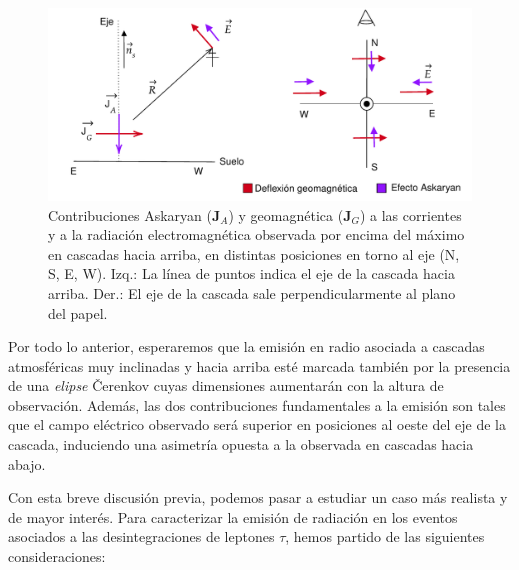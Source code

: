 \documentclass[11 pt, a4paper]{article} %
\numberwithin{equation}{section}
\numberwithin{figure}{section}
\numberwithin{table}{section}
\newcommand{\vect}[1]{\boldsymbol{\mathbf{#1}}}
\begin{document}
\begin{figure}[H]
	\centering
	\includegraphics[width=.8\linewidth]{figures/Radio_UG/Polarizacion_UG}
	\caption{Contribuciones Askaryan ($\vect{J}_A$) y geomagnética ($\vect{J}_G$) a las corrientes y a la radiación electromagnética observada por encima del máximo en cascadas hacia arriba, en distintas posiciones en torno al eje (N, S, E, W). Izq.: La línea de puntos indica el eje de la cascada hacia arriba. Der.: El eje de la cascada sale perpendicularmente al plano del papel.}
	\label{Polarizacion_UG}
\end{figure}
Por todo lo anterior, esperaremos que la emisión en radio asociada a cascadas atmosféricas muy inclinadas y hacia arriba esté marcada también por la presencia de una \textit{elipse} \v{C}erenkov cuyas dimensiones aumentarán con la altura de observación. Además, las dos contribuciones fundamentales a la emisión son tales que el campo eléctrico observado será superior en posiciones al oeste del eje de la cascada, induciendo una asimetría opuesta a la observada en cascadas hacia abajo.

Con esta breve discusión previa, podemos pasar a estudiar un caso más realista y de mayor interés. Para caracterizar la emisión de radiación en los eventos asociados a las desintegraciones de leptones $\tau$, hemos partido de las siguientes consideraciones:
\end{document}
